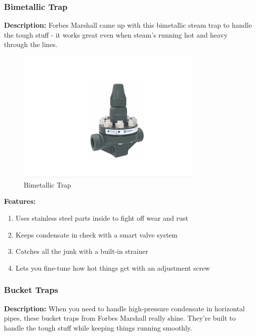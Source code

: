 \subsubsection{Bimetallic Trap}
\textbf{Description:} Forbes Marshall came up with this bimetallic steam trap to handle the tough stuff - it works great even when steam’s running hot and heavy through the lines.
\begin{figure}[h]
    \centering
    \includegraphics[width=0.8\textwidth,height=0.33\textheight,keepaspectratio]{figs/lastmin/bimetallic_thermostatic_steam_trap.png}
    \caption{Bimetallic Trap}
    \label{fig:bimetallic_trap}
\end{figure}


\textbf{Features:}
\begin{enumerate}
    \item Uses stainless steel parts inside to fight off wear and rust
    \item Keeps condensate in check with a smart valve system
    \item Catches all the junk with a built-in strainer
    \item Lets you fine-tune how hot things get with an adjustment screw
\end{enumerate}

\subsubsection{Bucket Traps}
\textbf{Description:} When you need to handle high-pressure condensate in horizontal pipes, these bucket traps from Forbes Marshall really shine. They’re built to handle the tough stuff while keeping things running smoothly.

